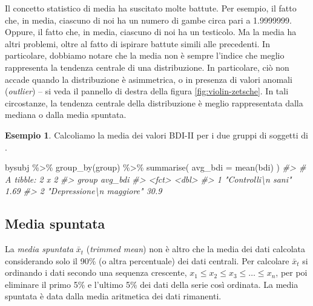\documentclass[
  10pt,
  italian,
  a4paper,
  extrafontsizes,onecolumn,openright
  ]{memoir}
\newenvironment{Shaded}{\begin{snugshade}}{\end{snugshade}}
\newcommand{\AttributeTok}[1]{\textcolor[rgb]{0.77,0.63,0.00}{#1}}
\newcommand{\CommentTok}[1]{\textcolor[rgb]{0.56,0.35,0.01}{\textit{#1}}}
\newcommand{\FunctionTok}[1]{\textcolor[rgb]{0.00,0.00,0.00}{#1}}
\newcommand{\NormalTok}[1]{#1}
\newcommand{\SpecialCharTok}[1]{\textcolor[rgb]{0.00,0.00,0.00}{#1}}
\theoremstyle{definition}
\theoremstyle{definition}
\newtheorem{example}{Esempio}[chapter]
\theoremstyle{definition}
\theoremstyle{definition}
\theoremstyle{remark}
\begin{document}
Il concetto statistico di media ha suscitato molte battute. Per esempio,
il fatto che, in media, ciascuno di noi ha un numero di gambe circa pari
a 1.9999999. Oppure, il fatto che, in media, ciascuno di noi ha un
testicolo. Ma la media ha altri problemi, oltre al fatto di ispirare
battute simili alle precedenti. In particolare, dobbiamo notare che la
media non è sempre l'indice che meglio rappresenta la tendenza centrale
di una distribuzione. In particolare, ciò non accade quando la
distribuzione è asimmetrica, o in presenza di valori anomali (\emph{outlier})
-- si veda il pannello di destra della figura \ref{fig:violin-zetsche}. In tali circostanze, la tendenza centrale della distribuzione è meglio rappresentata dalla mediana o dalla media spuntata.

\begin{example}

Calcoliamo la media dei valori BDI-II per i due gruppi di soggetti di \textcite{zetschefuture2019}.

\begin{Shaded}
\begin{Highlighting}[]
\NormalTok{bysubj }\SpecialCharTok{\%\textgreater{}\%} 
  \FunctionTok{group\_by}\NormalTok{(group) }\SpecialCharTok{\%\textgreater{}\%} 
  \FunctionTok{summarise}\NormalTok{(}
    \AttributeTok{avg\_bdi =} \FunctionTok{mean}\NormalTok{(bdi)}
\NormalTok{  ) }
\CommentTok{\#\textgreater{} \# A tibble: 2 x 2}
\CommentTok{\#\textgreater{}   group                    avg\_bdi}
\CommentTok{\#\textgreater{}   \textless{}fct\textgreater{}                      \textless{}dbl\textgreater{}}
\CommentTok{\#\textgreater{} 1 "Controlli\textbackslash{}n sani"          1.69}
\CommentTok{\#\textgreater{} 2 "Depressione\textbackslash{}n maggiore"   30.9}
\end{Highlighting}
\end{Shaded}

\end{example}

\hypertarget{media-spuntata}{%
\subsection{Media spuntata}\label{media-spuntata}}

La \emph{media spuntata} \(\bar{x}_t\) (\emph{trimmed mean}) non è altro che la
media dei dati calcolata considerando solo il 90\% (o altra percentuale)
dei dati centrali. Per calcolare \(\bar{x}_t\) si ordinando i dati secondo
una sequenza crescente, \(x_1 \leq x_2 \leq x_3 \leq \dots \leq x_n\), per
poi eliminare il primo 5\% e l'ultimo 5\% dei dati della serie così
ordinata. La media spuntata è data dalla media aritmetica dei dati rimanenti.
\end{document}
